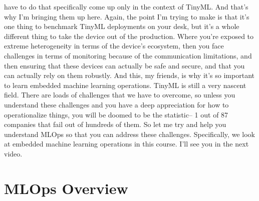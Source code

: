 have to do that specifically come up only in the context of TinyML.
And that's why I'm bringing them up here.
Again, the point I'm trying to make is that it's
one thing to benchmark TinyML deployments on your desk,
but it's a whole different thing to take the device out of the production.
Where you're exposed to extreme heterogeneity
in terms of the device's ecosystem, then you
face challenges in terms of monitoring because of the communication
limitations, and then ensuring that these devices can actually
be safe and secure, and that you can actually rely on them robustly.
And this, my friends, is why it's so important
to learn embedded machine learning operations.
TinyML is still a very nascent field.
There are loads of challenges that we have to overcome,
so unless you understand these challenges
and you have a deep appreciation for how to operationalize things,
you will be doomed to be the statistic--
1 out of 87 companies that fail out of hundreds of them.
So let me try and help you understand MLOps so
that you can address these challenges.
Specifically, we look at embedded machine
learning operations in this course.
I'll see you in the next video.


\section{MLOps Overview}

